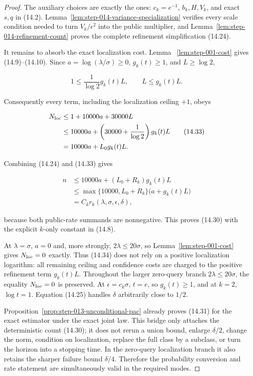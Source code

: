 \begin{proof}
The auxiliary choices are exactly the ones: \(c_k=e^{-1}\), \(b_k,H,V_k\), and exact \(s,q\) in
(14.2). Lemma~\ref{lem:step-014-variance-specialization} verifies every
scale condition needed to turn \(V_k/\epsilon^2\) into the public
multiplier, and Lemma~\ref{lem:step-014-refinement-count} proves the
complete refinement simplification (14.24).

It remains to absorb the exact localization cost. Lemma~
\ref{lem:step-001-cost} gives
(14.9)--(14.10). Since \(a=\log(\lambda/\sigma)\geq0\),
\(g_k(t)\geq1\), and \(L\geq\log2\),

\[
1\leq\frac1{\log2}g_k(t)L,
\qquad
L\leq g_k(t)L.
\tag{14.32}
\]

Consequently every term, including the localization ceiling \(+1\), obeys

\[
\begin{aligned}
N_{\rm loc}
&\leq1+10000a+30000L\\
&\leq10000a+
\left(30000+\frac1{\log2}\right)g_k(t)L\\
&=10000a+L_0g_k(t)L.
\end{aligned}
\tag{14.33}
\]

Combining (14.24) and (14.33) gives

\[
\begin{aligned}
n
&\leq10000a+(L_0+R_k)g_k(t)L\\
&\leq\max\{10000,L_0+R_k\}
\bigl(a+g_k(t)L\bigr)\\
&=C_kr_k(\lambda,\sigma,\epsilon,\delta),
\end{aligned}
\tag{14.34}
\]

because both public-rate summands are nonnegative. This proves (14.30) with
the explicit \(k\)-only constant in (14.8).

At \(\lambda=\sigma\), \(a=0\) and, more strongly,
\(2\lambda\leq20\sigma\), so Lemma~\ref{lem:step-001-cost} gives
\(N_{\rm loc}=0\) exactly. Thus (14.34) does not rely on a positive
localization logarithm: all remaining ceiling and confidence costs are
charged to the positive refinement term \(g_k(t)L\). Throughout the larger
zero-query branch \(2\lambda\leq20\sigma\), the equality
\(N_{\rm loc}=0\) is preserved. At \(\epsilon=c_k\sigma\), \(t=e\), so
\(g_k(t)\geq1\), and at \(k=2\), \(\log t=1\). Equation (14.25) handles
\(\delta\) arbitrarily close to \(1/2\).

Proposition~\ref{prop:step-013-unconditional-pac} already proves (14.31) for the exact estimator under the
exact joint law. This bridge only attaches the deterministic count (14.30);
it does not rerun a union bound, enlarge \(\delta/2\), change the norm,
condition on localization, replace the full class by a subclass, or turn the
horizon into a stopping time. In the zero-query localization branch it also
retains the sharper failure bound \(\delta/4\). Therefore the
probability conversion and rate statement are simultaneously valid in the
required modes.
\end{proof}


